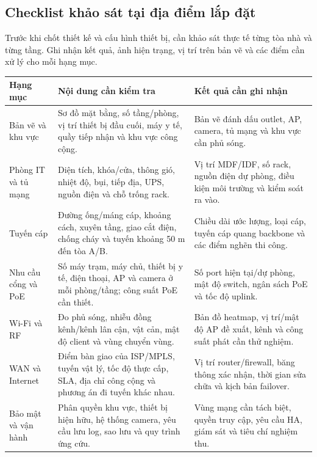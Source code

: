 \subsection{Checklist khảo sát tại địa điểm lắp đặt}

Trước khi chốt thiết kế và cấu hình thiết bị, cần khảo sát thực tế từng tòa nhà và từng tầng. Ghi nhận kết quả, ảnh hiện trạng, vị trí trên bản vẽ và các điểm cần xử lý cho mỗi hạng mục.

\begin{tabularx}{\textwidth}{|X|X|X|}
\hline
\textbf{Hạng mục} & \textbf{Nội dung cần kiểm tra} & \textbf{Kết quả cần ghi nhận} \\
\hline
\fbox{\rule{0pt}{1.2ex}\hspace{1.2ex}}\; Bản vẽ và khu vực & Sơ đồ mặt bằng, số tầng/phòng, vị trí thiết bị đầu cuối, máy y tế, quầy tiếp nhận và khu vực công cộng. & Bản vẽ đánh dấu outlet, AP, camera, tủ mạng và khu vực cần phủ sóng. \\
\hline
\fbox{\rule{0pt}{1.2ex}\hspace{1.2ex}}\; Phòng IT và tủ mạng & Diện tích, khóa/cửa, thông gió, nhiệt độ, bụi, tiếp địa, UPS, nguồn điện và chỗ trống rack. & Vị trí MDF/IDF, số rack, nguồn điện dự phòng, điều kiện môi trường và kiểm soát ra vào. \\
\hline
\fbox{\rule{0pt}{1.2ex}\hspace{1.2ex}}\; Tuyến cáp & Đường ống/máng cáp, khoảng cách, xuyên tầng, giao cắt điện, chống cháy và tuyến khoảng 50 m đến tòa A/B. & Chiều dài ước lượng, loại cáp, tuyến cáp quang backbone và các điểm nghẽn thi công. \\
\hline
\fbox{\rule{0pt}{1.2ex}\hspace{1.2ex}}\; Nhu cầu cổng và PoE & Số máy trạm, máy chủ, thiết bị y tế, điện thoại, AP và camera ở mỗi phòng/tầng; công suất PoE cần thiết. & Số port hiện tại/dự phòng, mật độ switch, ngân sách PoE và tốc độ uplink. \\
\hline
\fbox{\rule{0pt}{1.2ex}\hspace{1.2ex}}\; Wi-Fi và RF & Đo phủ sóng, nhiễu đồng kênh/kênh lân cận, vật cản, mật độ client và vùng chuyển vùng. & Bản đồ heatmap, vị trí/mật độ AP đề xuất, kênh và công suất phát cần thử nghiệm. \\
\hline
\fbox{\rule{0pt}{1.2ex}\hspace{1.2ex}}\; WAN và Internet & Điểm bàn giao của ISP/MPLS, tuyến vật lý, tốc độ thực cấp, SLA, địa chỉ công cộng và phương án đi tuyến khác nhau. & Vị trí router/firewall, băng thông xác nhận, thời gian sửa chữa và kịch bản failover. \\
\hline
\fbox{\rule{0pt}{1.2ex}\hspace{1.2ex}}\; Bảo mật và vận hành & Phân quyền khu vực, thiết bị hiện hữu, hệ thống camera, yêu cầu lưu log, sao lưu và quy trình ứng cứu. & Vùng mạng cần tách biệt, quyền truy cập, yêu cầu HA, giám sát và tiêu chí nghiệm thu. \\
\hline
\end{tabularx}

